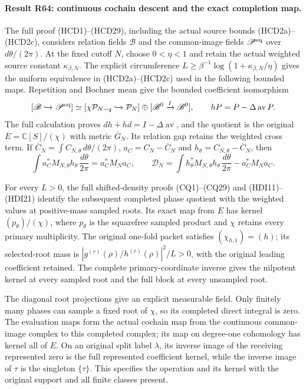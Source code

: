\paragraph{Result R64: continuous cochain descent and the exact completion map.}
The full proof (HCD1)--(HCD29), including the actual source bounds
(HCD2a)--(HCD2c), considers relation fields $\mathscr B$ and the
common-image fields $\mathscr P^{\rm eq}$ over $d\theta/(2\pi)$.
At the fixed cutoff $N$, choose $0<\eta<1$ and retain the actual
weighted source constant $\kappa_{\beta,N}$. The explicit
circumference
$L\ge\beta^{-1}\log(1+\kappa_{\beta,N}/\eta)$ gives the uniform
equivalence in (HCD2a)--(HCD2c) used in the following bounded maps.
Repetition and Bochner mean give the bounded coefficient isomorphism
\[
 [\mathscr B\hookrightarrow\mathscr P^{\rm eq}]
 \simeq[\chi\mathcal P_{N-q}\hookrightarrow\mathcal P_N]
       \oplus[\mathscr B^0\xrightarrow{I}\mathscr B^0],
 \qquad hP=P-\Delta\operatorname{av}P .
\]
The full calculation proves $dh+hd=I-\Delta\operatorname{av}$,
and the quotient is the original $E=\mathbb C[S]/(\chi)$ with
metric $\overline G_N$. Its relation gap retains the weighted
cross term. If $\overline C_N=\int C_{N,\theta}\,d\theta/(2\pi)$,
$a_C=C_N-\overline C_N$ and $h_\theta=C_{N,\theta}-\overline C_N$,
then
\[
 \int a_C^*M_{N,\theta}h_\theta\,\frac{d\theta}{2\pi}=a_C^*M_Na_C,
 \qquad
 \mathscr D_N=\int h_\theta^*M_{N,\theta}h_\theta
                    \,\frac{d\theta}{2\pi}-a_C^*M_Na_C .
\]

For every $L>0$, the full shifted-density proofs (CQ1)--(CQ29) and
(HDI11)--(HDI21) identify the subsequent completed phase quotient with the weighted
values at positive-mass sampled roots. Its exact map from $E$ has
kernel $(p_\theta)/(\chi)$, where $p_\theta$ is the squarefree
sampled product and $\chi$ retains every primary multiplicity.
The original one-fold packet satisfies $(\chi_{h,1})=(h)$; its
selected-root mass is
$|g^{(r)}(\rho)/h^{(r)}(\rho)|^2/L>0$, with the original leading
coefficient retained. The complete primary-coordinate inverse gives
the nilpotent kernel at every sampled root and the full block at
every unsampled root.

The diagonal root projections give an explicit measurable field.
Only finitely many phases can sample a fixed root of $\chi$, so
its completed direct integral is zero. The evaluation maps form
the actual cochain map from the continuous common-image complex
to this completed complex; its map on degree-one cohomology has
kernel all of $E$. On an original split label $\lambda$, its
inverse image of the receiving represented zero is the full
represented coefficient kernel, while the inverse image of $\tau$
is the singleton $\{\tau\}$. This specifies the operation and its
kernel with the original support and all finite classes present.

